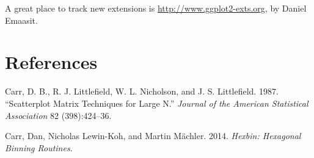 A great place to track new extensions is
\url{http://www.ggplot2-exts.org}, by Daniel Emaasit.

\hypertarget{references}{%
\section*{References}\label{references}}

\hypertarget{refs}{}
\leavevmode\hypertarget{ref-carr:1987}{}%
Carr, D. B., R. J. Littlefield, W. L. Nicholson, and J. S. Littlefield.
1987. ``Scatterplot Matrix Techniques for Large N.'' \emph{Journal of
the American Statistical Association} 82 (398):424--36.

\leavevmode\hypertarget{ref-hexbin}{}%
Carr, Dan, Nicholas Lewin-Koh, and Martin Mächler. 2014. \emph{Hexbin:
Hexagonal Binning Routines}.

